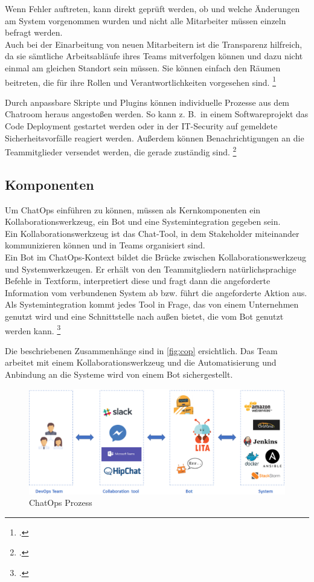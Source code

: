 Wenn Fehler auftreten, kann direkt geprüft werden, ob und welche Änderungen am System vorgenommen wurden und nicht alle Mitarbeiter müssen einzeln befragt werden.\\
Auch bei der Einarbeitung von neuen Mitarbeitern ist die Transparenz hilfreich, da sie sämtliche Arbeitsabläufe ihres Teams mitverfolgen können und dazu nicht einmal am gleichen Standort sein müssen. Sie können einfach den Räumen beitreten, die für ihre Rollen und Verantwortlichkeiten vorgesehen sind.
\footcites[Vgl.][o. \pno]{Sigler_2014_Chatops}[Vgl.][66]{Hand_2016_ChatOps}

Durch anpassbare Skripte und Plugins können individuelle Prozesse aus dem Chatroom heraus angestoßen werden. So kann z. B.~in einem Softwareprojekt das Code Deployment gestartet werden oder in der IT-Security auf gemeldete Sicherheitsvorfälle reagiert werden. Außerdem können Benachrichtigungen an die Teammitglieder versendet werden, die gerade zuständig sind.
\footcite[Vgl.][o. \pno]{Sigler_2014_Chatops}

\subsection{Komponenten}
Um ChatOps einführen zu können, müssen als Kernkomponenten ein Kollaborationswerkzeug, ein Bot und eine Systemintegration gegeben sein.\\
Ein Kollaborationswerkzeug ist das Chat-Tool, in dem Stakeholder miteinander kommunizieren können und in Teams organisiert sind.\\
Ein Bot im ChatOps-Kontext bildet die Brücke zwischen Kollaborationswerkzeug und Systemwerkzeugen. Er erhält von den Teammitgliedern natürlichsprachige Befehle in Textform, interpretiert diese und fragt dann die angeforderte Information vom verbundenen System ab bzw. führt die angeforderte Aktion aus.\\
Als Systemintegration kommt jedes Tool in Frage, das von einem Unternehmen genutzt wird und eine Schnittstelle nach außen bietet, die vom Bot genutzt werden kann.
\footcite[Vgl.][o. \pno]{Zyane_2017_ChatOps}


Die beschriebenen Zusammenhänge sind in \autoref{fig:cop} ersichtlich. Das Team arbeitet mit einem Kollaborationswerkzeug und die Automatisierung und Anbindung an die Systeme wird von einem Bot sichergestellt.

\begin{figure}[H]
  \centering
  \includegraphics[width=\textwidth]{Anhang/cop}
  \caption{ChatOps Prozess}
\label{fig:cop}
\end{figure}


